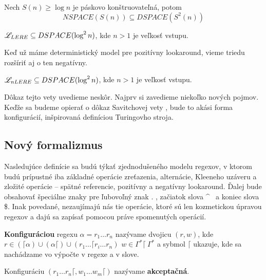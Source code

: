 \begin{veta}
Nech $S(n)\geq \log n$ je páskovo konštruovateľná, potom 
$$ NSPACE(S(n)) \subseteq DSPACE(S^2(n)) $$
\end{veta}

\begin{dosledok}
$\mathscr{L}_{LERE} \subseteq DSPACE(\log^2 n)$, kde $n>1$ je veľkosť vstupu.
\end{dosledok}

Keď už máme deterministický model pre pozitívny lookaround, vieme triedu rozšíriť aj o ten negatívny.
\begin{veta}
$\mathscr{L}_{nLERE} \subseteq DSPACE(\log^2 n)$, kde $n>1$ je veľkosť vstupu.
\end{veta}
Dôkaz tejto vety uvedieme neskôr. Najprv si zavedieme niekoľko nových pojmov. Keďže sa budeme opierať o dôkaz Savitchovej vety \cite{Savitch_skripta}, bude to akási forma konfigurácií, inšpirovaná definíciou Turingovho stroja.

\subsection{Nový formalizmus}

Nasledujúce definície sa budú týkať zjednodušeného modelu regexov, v ktorom budú prípustné iba základné operácie zreťazenia, alternácie, Kleeneho uzáveru a zložité operácie -- spätné referencie, pozitívny a negatívny lookaround. Ďalej bude obsahovať špeciálne znaky pre ľubovoľný znak . , začiatok slova \textasciicircum~ a koniec slova \$. Inak povedané, nezaujímajú nás tie operácie, ktoré sú len kozmetickou úpravou regexov a dajú sa zapísať pomocou práve spomenutých operácií.

\begin{df}
\textbf{Konfiguráciou} regexu $\alpha = r_1 \dots r_n$ nazývame dvojicu $(r, w)$, kde $r \in (\lceil\alpha)\cup(\alpha\lceil)\cup(r_1 \dots \lceil r_i \dots r_n)$ $w \in \Gamma^*\lceil~ \Gamma^*$ a sybmol $\lceil$ ukazuje, kde sa nachádzame vo výpočte v regexe a v slove.
\end{df}

\begin{df}
Konfiguráciu $(r_1 \dots r_n \lceil, w_1\dots w_m \lceil)$ nazývame \textbf{akceptačná}.
\end{df}

